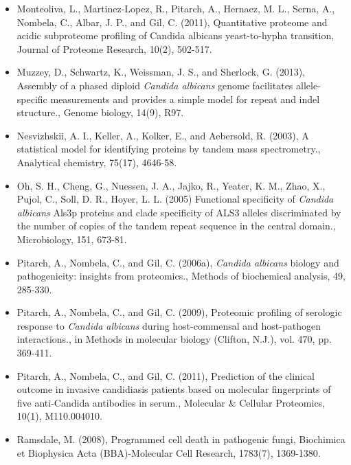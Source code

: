 \begin{itemize}
\item[]{%
Monteoliva, L., Martinez-Lopez, R., Pitarch, A., Hernaez, M. L., Serna, A., Nombela, C., Albar,
J. P., and Gil, C. (2011), Quantitative proteome and acidic subproteome profiling of Candida
albicans yeast-to-hypha transition, Journal of Proteome Research, 10(2), 502-517.
}

\item[]{%
Muzzey, D., Schwartz, K., Weissman, J. S., and Sherlock, G. (2013), Assembly of a phased
diploid \textit{Candida albicans} genome facilitates allele-specific measurements and provides a
simple model for repeat and indel structure., Genome biology, 14(9), R97.
}

\item[]{%
Nesvizhskii, A. I., Keller, A., Kolker, E., and Aebersold, R. (2003), A statistical model for 
identifying proteins by tandem mass spectrometry., Analytical chemistry, 75(17), 4646-58.
}

\item[]{
Oh, S. H., Cheng, G., Nuessen, J. A., Jajko, R., Yeater, K. M., Zhao, X., Pujol, C., Soll, D. R., Hoyer,  L. L. (2005)
Functional specificity of \textit{Candida albicans} Als3p proteins and clade specificity of ALS3 
alleles discriminated by the number of copies of the tandem repeat sequence in the central domain.,
Microbiology, 151, 673-81.
}

\item[]{%
Pitarch, A., Nombela, C., and Gil, C. (2006a), \textit{Candida albicans} biology and pathogenicity:
insights from proteomics., 
Methods of biochemical analysis, 49, 285-330.
}

\item[]{%
Pitarch, A., Nombela, C., and Gil, C. (2009), Proteomic profiling of serologic response to 
\textit{Candida albicans} during host-commensal and host-pathogen interactions., 
in Methods in molecular biology (Clifton, N.J.), vol. 470, pp. 369-411.
}

\item[]{%
Pitarch, A., Nombela, C., and Gil, C. (2011), Prediction of the clinical outcome in invasive 
candidiasis patients based on molecular fingerprints of five anti-Candida antibodies in serum.,
Molecular \& Cellular Proteomics, 10(1), M110.004010.
}

\item[]{%
Ramsdale, M. (2008), Programmed cell death in pathogenic fungi, Biochimica et Biophysica
Acta (BBA)-Molecular Cell Research, 1783(7), 1369-1380.
}



\end{itemize}
